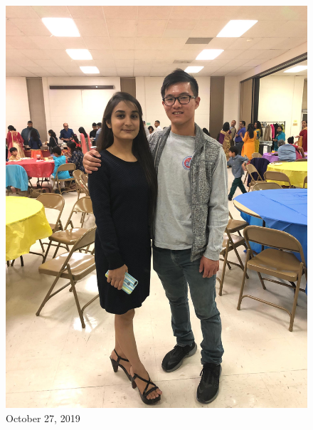 \documentclass[
]{book}
\begin{document}
\begin{figure}
\centering
\includegraphics[width=5.20833in,height=\textheight]{mimages/0 8-27-2019.jpg}
\caption{October 27, 2019}
\end{figure}
\end{document}
